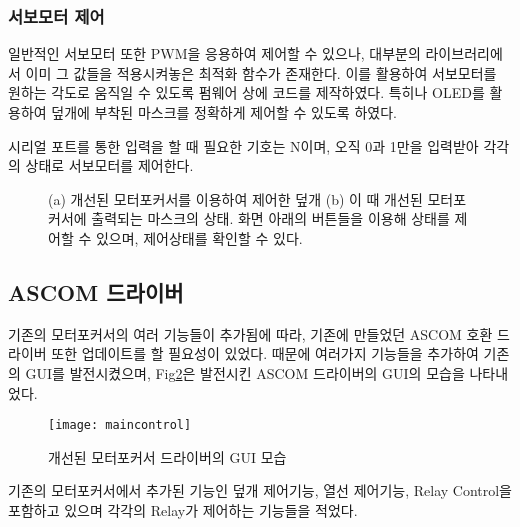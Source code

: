 \subsubsection{서보모터 제어}
 일반적인 서보모터 또한 PWM을 응용하여 제어할 수 있으나, 대부분의 라이브러리에서 이미 그 값들을 적용시켜놓은 최적화 함수가 존재한다. 이를 활용하여 서보모터를 원하는 각도로 움직일 수 있도록 펌웨어 상에 코드를 제작하였다. 특히나 OLED를 활용하여 덮개에 부착된 마스크를 정확하게 제어할 수 있도록 하였다.
 
 시리얼 포트를 통한 입력을 할 때 필요한 기호는 N이며, 오직 0과 1만을 입력받아 각각의 상태로 서보모터를 제어한다.

	\begin{figure}[ht]
	\begin{center}
	\end{center}
	\caption{(a) 개선된 모터포커서를 이용하여 제어한 덮개 (b) 이 때 개선된 모터포커서에 출력되는 마스크의 상태. 화면 아래의 버튼들을 이용해 상태를 제어할 수 있으며, 제어상태를 확인할 수 있다.}
\label{mask_status}


\end{figure}


 
\newpage
\subsection{ASCOM 드라이버}

 기존의 모터포커서의 여러 기능들이 추가됨에 따라, 기존에 만들었던 ASCOM 호환 드라이버 또한 업데이트를 할 필요성이 있었다. 때문에 여러가지 기능들을 추가하여 기존의 GUI를 발전시켰으며, Fig\ref{maincontrol}은 발전시킨 ASCOM 드라이버의 GUI의 모습을 나타내었다.
 
 \begin{figure}[h]
	\begin{center}
		\texttt{[image: maincontrol]}
	\end{center}
	\caption{개선된 모터포커서 드라이버의 GUI 모습}
	\label{maincontrol}
\end{figure}

 기존의 모터포커서에서 추가된 기능인 덮개 제어기능, 열선 제어기능, Relay Control을 포함하고 있으며 각각의 Relay가 제어하는 기능들을 적었다.
